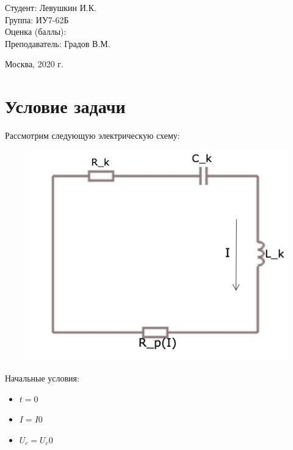 \documentclass[a4paper,12pt]{article}
\begin{document}
\vspace*{20mm}

\large
\begin{flushleft}
	Студент: Левушкин И.К. \\
	Группа: ИУ7-62Б \\
	Оценка (баллы): \\
	Преподаватель: Градов В.М.
\end{flushleft}

\vspace*{50mm}

\large
\begin{center}
	Москва, 2020 г.
\end{center}

\thispagestyle{empty}

\newpage

\section{Условие задачи}

Рассмотрим следующую электрическую схему:
\begin{figure}[h!]
	\begin{center}
		{\includegraphics[scale = 0.4]{chain.jpg}}
		\label{chain}
	\end{center}
\end{figure}

Начальные условия:
\begin{itemize}
	\item $t = 0$
	\item $I = I0$
	\item $U_c = U_c0$
\end{itemize}
\end{document}
